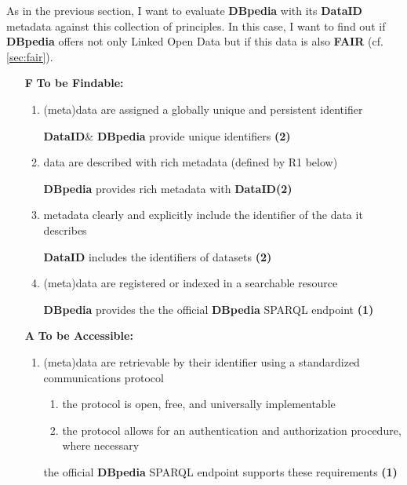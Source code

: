 \documentclass[a4paper,english,twoside,BCOR1.5cm,headsepline,DIV12,appendixprefix,final,12pt]{scrbook}
\newcommand{\dataid}{{\ttfamily\bfseries DataID}\xspace}
\newcommand{\dbpedia}{{\ttfamily\bfseries DBpedia}\xspace}
\begin{document}
As in the previous section, I want to evaluate \dbpedia with its \dataid metadata against this collection of principles. In this case, I want to find out if \dbpedia offers not only Linked Open Data but if this data is also \textbf{FAIR} (cf. \cref{sec:fair}). 

\begin{enumerate}
\item[\textbf{F}] \textbf{To be Findable:}
\begin{enumerate}[1]
\item (meta)data are assigned a globally unique and persistent identifier
\begin{flushright}\dataid \& \dbpedia provide unique identifiers \textbf{\color{ForestGreen}(2)}\end{flushright}
\item data are described with rich metadata (defined by R1 below)
\begin{flushright}\dbpedia provides rich metadata with \dataid \textbf{\color{ForestGreen}(2)}\end{flushright}
\item metadata clearly and explicitly include the identifier of the data it describes
\begin{flushright}\dataid includes the identifiers of datasets \textbf{\color{ForestGreen}(2)}\end{flushright}
\item (meta)data are registered or indexed in a searchable resource
\begin{flushright}\dbpedia provides the the official \dbpedia SPARQL endpoint \textbf{\color{BurntOrange}(1)}\end{flushright}
\end{enumerate}
\item[\textbf{A}] \textbf{To be Accessible:}
\begin{enumerate}[1]
\item (meta)data are retrievable by their identifier using a standardized communications protocol
\begin{enumerate}
\item the protocol is open, free, and universally implementable
\item the protocol allows for an authentication and authorization procedure, where necessary
\end{enumerate}
\begin{flushright}
the official \dbpedia SPARQL endpoint supports these requirements \textbf{\color{BurntOrange}(1)}
\end{flushright}

\end{enumerate}
\end{enumerate}
\end{document}
